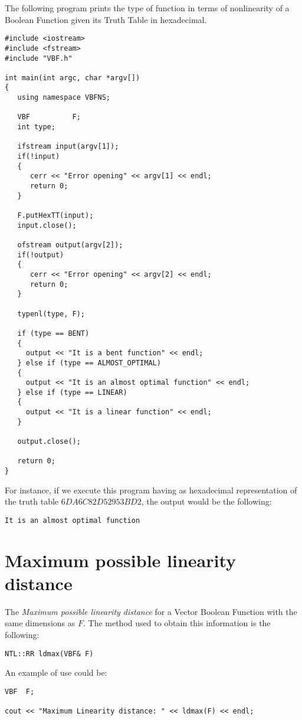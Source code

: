 The following program prints the type of function in terms of nonlinearity of a Boolean Function given its Truth Table in hexadecimal.

\begin{verbatim}
#include <iostream>
#include <fstream>
#include "VBF.h"

int main(int argc, char *argv[])
{
   using namespace VBFNS;

   VBF          F;
   int type;

   ifstream input(argv[1]);
   if(!input)
   {
      cerr << "Error opening" << argv[1] << endl;
      return 0;
   }

   F.putHexTT(input);
   input.close();

   ofstream output(argv[2]);
   if(!output)
   {
      cerr << "Error opening" << argv[2] << endl;
      return 0;
   }

   typenl(type, F);

   if (type == BENT)
   {
     output << "It is a bent function" << endl;
   } else if (type == ALMOST_OPTIMAL)
   {
     output << "It is an almost optimal function" << endl;
   } else if (type == LINEAR)
   {
     output << "It is a linear function" << endl;
   }

   output.close();

   return 0;
}

\end{verbatim}

For instance, if we execute this program having as hexadecimal representation of the truth table $6DA6C82D52953BD2$, the output would be the following:

\begin{verbatim}
It is an almost optimal function
\end{verbatim}

\section{Maximum possible linearity distance}

The \textsl{Maximum possible linearity distance} for a Vector Boolean
  Function with the same dimensions as $F$. The method used to obtain this information is the following:

\begin{verbatim}
NTL::RR ldmax(VBF& F)
\end{verbatim}

An example of use could be:

\begin{verbatim}
VBF  F;

cout << "Maximum Linearity distance: " << ldmax(F) << endl;
\end{verbatim}

